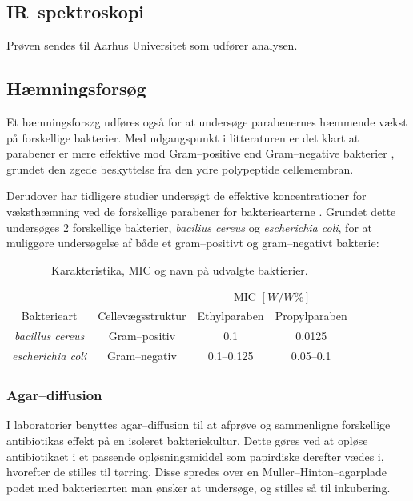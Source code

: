     \subsection{IR--spektroskopi}
    Prøven sendes til Aarhus Universitet som udfører analysen.

    \subsection{Hæmningsforsøg}
    Et hæmningsforsøg udføres også for at undersøge parabenernes hæmmende vækst på forskellige bakterier. Med udgangspunkt i litteraturen er det klart at parabener er mere effektive mod Gram--positive end Gram--negative bakterier \parencite{Joao2021}, grundet den øgede beskyttelse fra den ydre polypeptide cellemembran. 

    Derudover har tidligere studier undersøgt de effektive koncentrationer for væksthæmning ved de forskellige parabener for bakteriearterne \parencite{Wies2019}. Grundet dette undersøges 2 forskellige bakterier, \textit{bacilius cereus} og \textit{escherichia coli}, for at muliggøre undersøgelse af både et gram--positivt og gram--negativt bakterie:
    \begin{table}[H]\centering
        \caption{Karakteristika, MIC og navn på udvalgte baktierier.}
        \begin{tabular}{cccc}
            \toprule
            & & \multicolumn{2}{c}{MIC $\left[\si{W\per W\%}\right]$} \\
            \cmidrule(r){3-4}
            Bakterieart & Cellevægsstruktur & Ethylparaben & Propylparaben \\
            \midrule
            \textit{bacillus cereus} & Gram--positiv & 0.1 & 0.0125 \\
            \textit{escherichia coli} & Gram--negativ & 0.1--0.125 & 0.05--0.1 \\
            \bottomrule
        \end{tabular}
    \end{table}
    
    \subsubsection{Agar--diffusion}
    I laboratorier benyttes agar--diffusion til at afprøve og sammenligne forskellige antibiotikas effekt på en isoleret bakteriekultur. Dette gøres ved at opløse antibiotikaet i et passende opløsningsmiddel som papirdiske derefter vædes i, hvorefter de stilles til tørring. Disse spredes over en Muller--Hinton--agarplade podet med bakteriearten man ønsker at undersøge, og stilles så til inkubering. 

